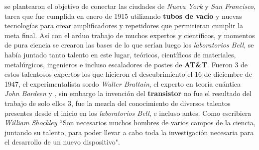 se plantearon el objetivo de conectar las ciudades de \emph{Nueva York} y \emph{San Francisco}, tarea que fue cumplida en enero de 1915 utilizando \textbf{tubos 
de vacío} y nuevas tecnologías para crear amplificadores y repetidores que permitieran cumplir la meta final. Así con el arduo trabajo de muchos expertos y científicos,
y momentos de pura ciencia se crearon las bases de lo que serían luego los \emph{laboratorios Bell}, se había juntado tanto talento en este lugar, teóricos, científicos de
materiales, metalúrgicos, ingenieros e incluso escaladores de postes de \textbf{AT\&T}. Fueron 3 de estos talentosos expertos los que hicieron el descubrimiento el 16 de
diciembre de 1947, el experimentalista sordo \emph{Walter Brattain}, el experto en teoría cuántica \emph{John Bardeen} y , sin embargo la invención del \textbf{transistor} no fue el resultado del trabajo de solo ellos 3, fue la mezcla del conocimiento de diversos talentos presentes 
desde el inicio en los \emph{laboratorios Bell}, e incluso antes. Como escribiera \emph{William Shockley} “Son necesarios muchos hombres de varios campos de la ciencia, 
juntando su talento, para poder llevar a cabo toda la investigación necesaria para el desarrollo de un nuevo dispositivo".\\

\section*{}
